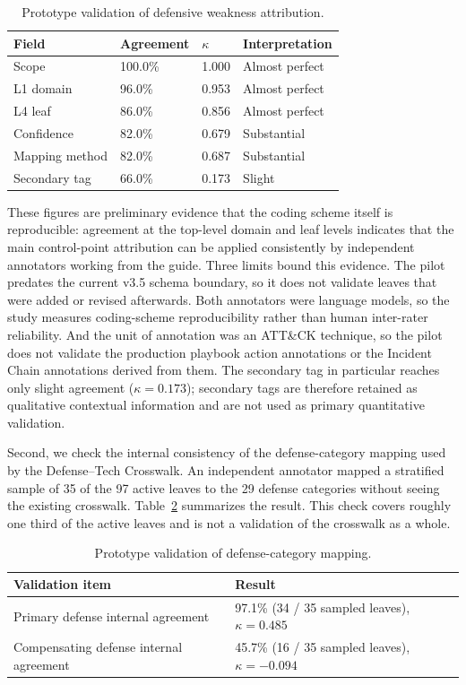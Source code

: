 \begin{table}[t]
\centering
\caption{Prototype validation of defensive weakness attribution.}
\label{tab:method-irr}
\begin{tabular}{p{}p{}p{}p{}}
\hline
Field & Agreement & $\kappa$ & Interpretation \\
\hline
Scope & 100.0\% & 1.000 & Almost perfect \\
L1 domain & 96.0\% & 0.953 & Almost perfect \\
L4 leaf & 86.0\% & 0.856 & Almost perfect \\
Confidence & 82.0\% & 0.679 & Substantial \\
Mapping method & 82.0\% & 0.687 & Substantial \\
Secondary tag & 66.0\% & 0.173 & Slight \\
\hline
\end{tabular}
\end{table}

These figures are preliminary evidence that the coding scheme itself is reproducible: agreement at the top-level domain and leaf levels indicates that the main control-point attribution can be applied consistently by independent annotators working from the guide. Three limits bound this evidence. The pilot predates the current v3.5 schema boundary, so it does not validate leaves that were added or revised afterwards. Both annotators were language models, so the study measures coding-scheme reproducibility rather than human inter-rater reliability. And the unit of annotation was an ATT\&CK technique, so the pilot does not validate the production playbook action annotations or the Incident Chain annotations derived from them. The secondary tag in particular reaches only slight agreement ($\kappa=0.173$); secondary tags are therefore retained as qualitative contextual information and are not used as primary quantitative validation.

Second, we check the internal consistency of the defense-category mapping used by the Defense--Tech Crosswalk. An independent annotator mapped a stratified sample of 35 of the 97 active leaves to the 29 defense categories without seeing the existing crosswalk. Table~\ref{tab:method-crosswalk-validation} summarizes the result. This check covers roughly one third of the active leaves and is not a validation of the crosswalk as a whole.

\begin{table}[t]
\centering
\caption{Prototype validation of defense-category mapping.}
\label{tab:method-crosswalk-validation}
\begin{tabular}{p{}p{}}
\hline
Validation item & Result \\
\hline
Primary defense internal agreement & 97.1\% (34 / 35 sampled leaves), $\kappa=0.485$ \\
Compensating defense internal agreement & 45.7\% (16 / 35 sampled leaves), $\kappa=-0.094$ \\
\hline
\end{tabular}
\end{table}


